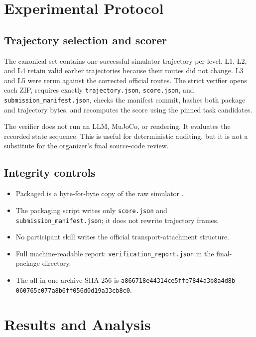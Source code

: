 \documentclass[11pt,a4paper]{article}
\begin{document}
\section{Experimental Protocol}

\subsection{Trajectory selection and scorer}

The canonical set contains one successful simulator trajectory per level. L1, L2, and L4 retain valid earlier trajectories because their routes did not change. L3 and L5 were rerun against the corrected official routes. The strict verifier opens each ZIP, requires exactly \texttt{trajectory.json}, \texttt{score.json}, and \texttt{submission\_manifest.json}, checks the manifest commit, hashes both package and trajectory bytes, and recomputes the score using the pinned task candidates.

The verifier does not run an LLM, MuJoCo, or rendering. It evaluates the recorded state sequence. This is useful for deterministic auditing, but it is not a substitute for the organizer's final source-code review.

\subsection{Integrity controls}

\begin{itemize}
\item Packaged  is a byte-for-byte copy of the raw simulator .
\item The packaging script writes only \texttt{score.json} and \texttt{submission\_manifest.json}; it does not rewrite trajectory frames.
\item No participant skill writes the official transport-attachment structure.
\item Full machine-readable report: \texttt{verification\_report.json} in the final-package directory.
\item The all-in-one archive SHA-256 is
\texttt{a866718e44314ce5}\allowbreak\texttt{ffe7844a3b8a4d8b}\allowbreak
\texttt{060765c077a8b6ff}\allowbreak\texttt{056d0d19a33cb8c0}.
\end{itemize}

\section{Results and Analysis}
\end{document}
